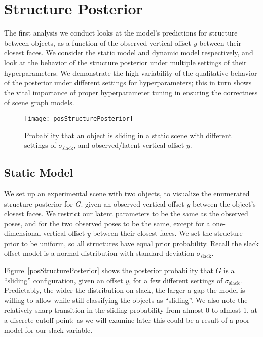 \section{Structure Posterior}
The first analysis we conduct looks at the model's predictions for structure between objects, as a function of the observed vertical offset $y$ between their closest faces.
We consider the static model and dynamic model respectively, and look at the behavior of the structure posterior under multiple settings of their hyperparameters.
We demonstrate the high variability of the qualitative behavior of the posterior under different settings for hyperparameters; this in turn shows the vital importance of proper hyperparameter tuning in ensuring the correctness of scene graph models.
\begin{figure}[h]
  \centering
  \texttt{[image: posStructurePosterior]}
  \caption{
    Probability that an object is sliding in a static scene with different settings of $\sigma_\mathrm{slack}$, and observed/latent vertical offset $y$.
  }
  \label{fig:posStructurePosterior}
\end{figure}

\subsection{Static Model}
We set up an experimental scene with two objects, to visualize the enumerated structure posterior for $G$.
given an observed vertical offset $y$ between the object's closest faces.
We restrict our latent parameters to be the same as the observed poses, and for the two observed poses to be the same, except for a one-dimensional vertical offset $y$ between their closest faces.
We set the structure prior to be uniform, so all structures have equal prior probability.
Recall the slack offset model is a normal distribution with standard deviation $\sigma_\mathrm{slack}$.

Figure~\ref{posStructurePosterior} shows the posterior probability that $G$ is a ``sliding'' configuration, given an offset $y$, for a few different settings of $\sigma_\mathrm{slack}$.
Predictably, the wider the distribution on slack, the larger a gap the model is willing to allow while still classifying the objects as ``sliding''.
We also note the relatively sharp transition in the sliding probability from almost 0 to almost 1, at a discrete cutoff point; as we will examine later this could be a result of a poor model for our slack variable.

